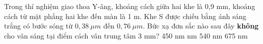 \begin{ex}%
Trong thí nghiệm giao thoa Y-âng, khoảng cách giữa hai khe là 0,9 mm, khoảng cách từ mặt phẳng hai khe đến màn là 1 m. Khe S được chiếu bằng ánh sáng trắng có bước sóng từ $0,38\ \mu m $ đến $0,76\ \mu m $. Bức xạ đơn sắc nào sau đây \textbf{không} cho vân sáng tại điểm cách vân trung tâm 3 mm?
\choice
{450 nm}
{ nm}
{540 nm}
{675 nm}
\end{ex} 

